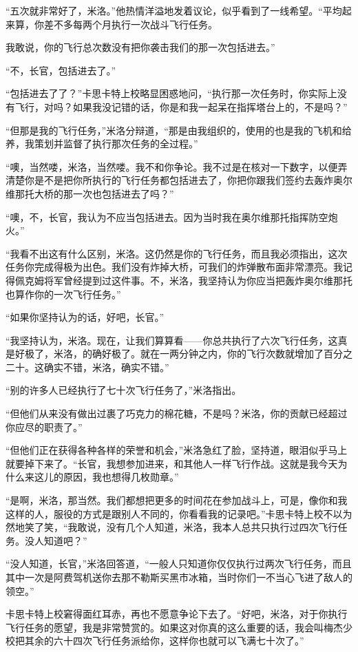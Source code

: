     “五次就非常好了，米洛。”他热情洋溢地发着议论，似乎看到了一线希望。“平均起来算，你差不多每两个月执行一次战斗飞行任务。

    我敢说，你的飞行总次数没有把你袭击我们的那一次包括进去。”

    “不，长官，包括进去了。”

    “包括进去了了？”卡思卡特上校略显困惑地问，“执行那一次任务时，你实际上没有飞行，对吗？如果我没记错的话，你是和我一起呆在指挥塔台上的，不是吗？”

    “但那是我的飞行任务，”米洛分辩道，“那是由我组织的，使用的也是我的飞机和给养，我策划并监督了执行那次任务的全过程。”

 


    “噢，当然喽，米洛，当然喽。我不和你争论。我不过是在核对一下数字，以便弄清楚你是不是把你所执行的飞行任务都包括进去了，你把你跟我们签约去轰炸奥尔维那托大桥的那一次也包括进去了吗？”

    “噢，不，长官，我认为不应当包括进去。因为当时我在奥尔维那托指挥防空炮火。”

    “我看不出这有什么区别，米洛。这仍然是你的飞行任务，而且我必须指出，这次任务你完成得极为出色。我们没有炸掉大桥，可我们的炸弹散布面非常漂亮。我记得佩克姆将军曾经提到过这件事。不，米洛，我坚持认为你应当把轰炸奥尔维那托也算作你的一次飞行任务。”

    “如果你坚持认为的话，好吧，长官。”

    “我坚持认为，米洛。现在，让我们算算看——你总共执行了六次飞行任务，这真是好极了，米洛，的确好极了。就在一两分钟之内，你的飞行次数就增加了百分之二十。这确实不错，米洛，确实不错。”

    “别的许多人已经执行了七十次飞行任务了，”米洛指出。

    “但他们从来没有做出过裹了巧克力的棉花糖，不是吗？米洛，你的贡献已经超过你应尽的职责了。”

    “但他们正在获得各种各样的荣誉和机会，”米洛急红了脸，坚持道，眼泪似乎马上就要掉下来了。“长官，我想参加进来，和其他人一样飞行作战。这就是我今天为什么来这儿的原因，我也想得几枚勋章。”

    “是啊，米洛，那当然。我们都想把更多的时间花在参加战斗上，可是，像你和我这样的人，服役的方式是跟别人不同的，你看看我的记录吧。”卡思卡特上校不以为然地笑了笑，“我敢说，没有几个人知道，米洛，我本人总共只执行过四次飞行任务。没人知道吧？”

    “没人知道，长官，”米洛回答道，“一般人只知道你仅仅执行过两次飞行任务，而且其中一次是阿费驾机送你去那不勒斯买黑市冰箱，当时你们一不当心飞进了敌人的领空。”

    卡思卡特上校窘得面红耳赤，再也不愿意争论下去了。“好吧，米洛，对于你执行飞行任务的愿望，我是非常赞赏的。如果这对你真的这么重要的话，我会叫梅杰少校把其余的六十四次飞行任务派给你，这样你也就可以飞满七十次了。”

